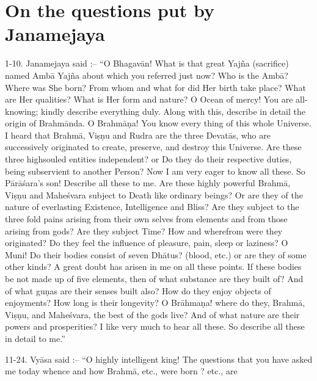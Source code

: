 \chapter{On the questions put by Janamejaya}

1-10. Janamejaya said :-- ``O Bhagav\=an! What is that great Yaj\~na (sacrifice) named Amb\=a Yaj\~na about which you referred just now? Who is the Amb\=a? Where was She born? From whom and what for did Her birth take place? What are Her qualities? What is Her form and nature? O Ocean of mercy! You are all-knowing; kindly describe everything duly. Along with this, describe in detail the origin of Brahm\=anda. O Brahm\=a\d{n}a! You know every thing of this whole Universe. I heard that Brahm\=a, Vi\d{s}\d{n}u and Rudra are the three Devat\=as, who are successively originated to create, preserve, and destroy this Universe. Are these three highsouled entities independent? or Do they do their respective duties, being subservient to another Person? Now I am very eager to know all these. So P\=ar\=a\'sara's son! Describe all these to me. Are these highly powerful Brahm\=a, Vi\d{s}\d{n}u and Mahe\'svara subject to Death like ordinary beings? Or are they of the nature of everlasting Existence, Intelligence and Bliss? Are they subject to the three fold pains arising from their own selves from elements and from those arising from gods? Are they subject Time? How and wherefrom were they originated? Do they feel the influence of pleasure, pain, sleep or laziness? O Muni! Do their bodies consist of seven Dh\=atus? (blood, etc.) or are they of some other kinds? A great doubt has arisen in me on all these points. If these bodies be not made up of five elements, then of what substance are they built of? And of what gu\d{n}as are their senses built also? How do they enjoy objects of enjoyments? How long is their longevity? O Br\=ahma\d{n}a! where do they, Brahm\=a, Vi\d{s}\d{n}u, and Mahe\'svara, the best of the gods live? And of what nature are their powers and prosperities? I like very much to hear all these. So describe all these in detail to me.''

11-24. Vy\=asa said :-- ``O highly intelligent king! The questions that you have asked me today whence and how Brahm\=a, etc., were born ? etc., are

